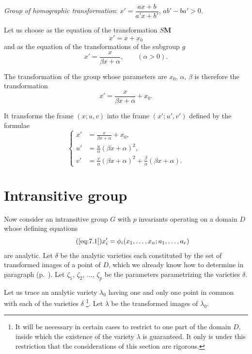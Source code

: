 {\somespace

\emph{Group of homographic transformation}: $x'=\dfrac{ax+b}{a'x+b'}$, $ab'-ba'>0$.

Let us choose as the equation of the transformation $S\mathbf{M}$
\[
x'=x+x_{0}
\]
and as the equation of the transformations of the subgroup $g$
\[
x'=\frac{x}{\beta x+\alpha},\qquad(\alpha>0).
\]

The transformation of the group whose parameters are $x_{0}$, $\alpha$, $\beta$ is therefore the transformation
\begin{equation}
  \label{eq:7.7}
  x'=\frac{x}{\beta x+\alpha}+x_{0}.
\end{equation}

It transforms the frame $(x;u,v)$ into the frame $(x';u',v')$ defined by the formulae
\begin{equation}
  \label{eq:7.8}
  \left\{
    \begin{aligned}
      x'&=\frac{x}{\beta x+\alpha}+x_{0},\\
      u'&=\frac{u}{\alpha}(\beta x+\alpha)^{2},\\
      v'&=\frac{v}{\alpha}(\beta x+\alpha)^{2}+\frac{\beta}{\alpha}(\beta x+\alpha).
    \end{aligned}
  \right.
\end{equation}
}



\section{Intransitive group}
\label{sec:intransitive-group}

\paragraph{}
\label{sec:103}
Now consider an intransitive group $G$ with $p$ invariants operating on a domain $D$ whose defining equations
\begin{equation}
  \label{eq:7.1a}\tag{\ref{eq:7.1}}
  x'_{i}=\phi_{i}(x_{1},\dots,x_{n};a_{1},\dots,a_{r})
\end{equation}
are analytic. Let $\delta$ be the analytic varieties each constituted by the set of transformed images of a point of $D$, which we already know how to determine in paragraph  (p.~\pageref{sec:94}). Let $\zeta_{1}$, $\zeta_{2}$, $\dots$, $\zeta_{p}$ be the parameters parametrizing the varieties $\delta$.

Let us trace an analytic variety $\lambda_{0}$ having one and only one point in common with each of the varieties $\delta$ \footnote{It will be necessary in certain cases to restrict to one part of the domain $D$, inside which the existence of the variety $\lambda$ is guaranteed. It only is under this restriction that the considerations of this section are rigorous.}. Let $\lambda$ be the transformed images of $\lambda_{0}$.

